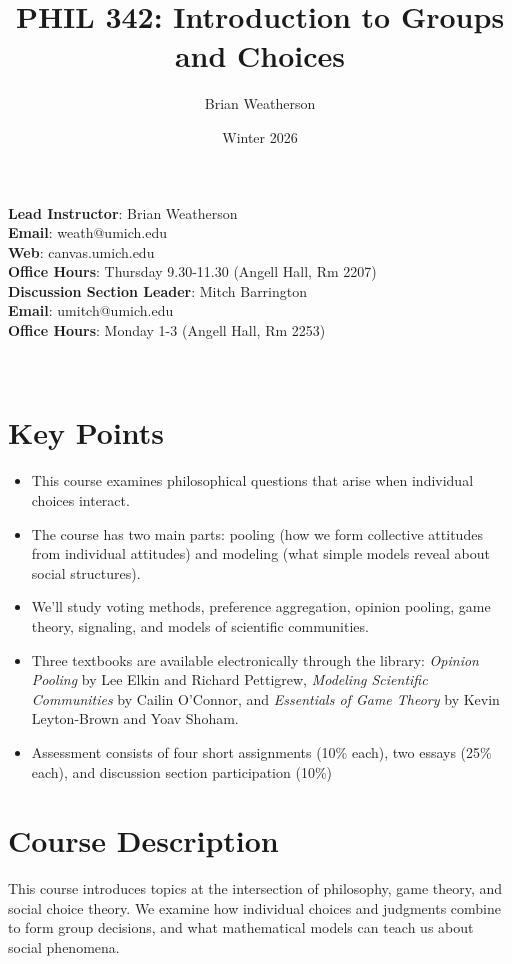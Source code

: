 \documentclass[
  letterpaper,
  DIV=11,
  numbers=noendperiod]{scrartcl}
\title{PHIL 342: Introduction to Groups and Choices}
\author{Brian Weatherson}
\date{Winter 2026}
\providecommand{\tightlist}{%
  \setlength{\itemsep}{0pt}\setlength{\parskip}{0pt}}
\begin{document}
\maketitle


\textbf{Lead Instructor}: Brian Weatherson\\
\textbf{Email}: weath@umich.edu\\
\textbf{Web}: canvas.umich.edu\\
\textbf{Office Hours}: Thursday 9.30-11.30 (Angell Hall, Rm 2207)\\
\textbf{Discussion Section Leader}: Mitch Barrington\\
\textbf{Email}: umitch@umich.edu\\
\textbf{Office Hours}: Monday 1-3 (Angell Hall, Rm 2253)

~

\section{Key Points}\label{key-points}

\begin{itemize}
\tightlist
\item
  This course examines philosophical questions that arise when
  individual choices interact.
\item
  The course has two main parts: pooling (how we form collective
  attitudes from individual attitudes) and modeling (what simple models
  reveal about social structures).
\item
  We'll study voting methods, preference aggregation, opinion pooling,
  game theory, signaling, and models of scientific communities.
\item
  Three textbooks are available electronically through the library:
  \emph{Opinion Pooling} by Lee Elkin and Richard Pettigrew,
  \emph{Modeling Scientific Communities} by Cailin O'Connor, and
  \emph{Essentials of Game Theory} by Kevin Leyton-Brown and Yoav
  Shoham.
\item
  Assessment consists of four short assignments (10\% each), two essays
  (25\% each), and discussion section participation (10\%)
\end{itemize}

\section{Course Description}\label{course-description}

This course introduces topics at the intersection of philosophy, game
theory, and social choice theory. We examine how individual choices and
judgments combine to form group decisions, and what mathematical models
can teach us about social phenomena.
\end{document}

